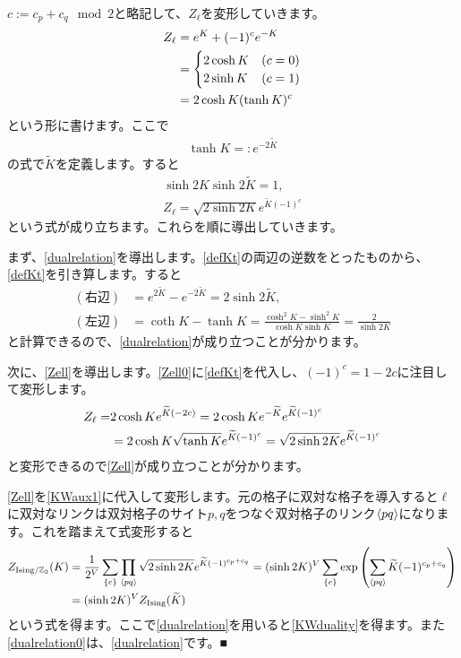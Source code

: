\documentclass[report,paper=a4, fontsize=12pt, line_length=16cm, number_of_lines=33,dvipdfmx]{jlreq}
\newcommand{\qed}{■}
\numberwithin{equation}{chapter}
\newcommand{\Zb}{\mathbb{Z}}
\newcommand{\ZIsing}{Z_{\mathrm{Ising}}}
\newcommand{\Zgauged}{Z_{\mathrm{Ising}/\Zb_2}}
\newcommand{\Kt}{\widetilde{K}}
\newcommand{\link}[1]{\expval{#1}}
\begin{document}
$c:=c_{p}+c_{q} \mod 2$と略記して、$Z_{\ell}$を変形していきます。
\begin{align}
  Z_{\ell}&=e^{K}+(-1)^{c}e^{-K}\notag\\
  &=\begin{cases}
    2\cosh K & (c=0)\\
    2\sinh K & (c=1)
  \end{cases}\notag \\
  &= 2 \cosh K (\tanh K)^{c} \label{Zell0}
\end{align}
という形に書けます。ここで
\begin{align}
  \tanh K =: e^{-2\Kt}\label{defKt}
\end{align}
の式で$\Kt$を定義します。すると
\begin{align}
  \sinh 2K \sinh 2\Kt =1,\label{dualrelation}\\
  Z_{\ell}=\sqrt{2\sinh 2K} e^{\Kt(-1)^{c}}\label{Zell}
\end{align}
という式が成り立ちます。これらを順に導出していきます。

まず、\eqref{dualrelation}を導出します。\eqref{defKt}の両辺の逆数をとったものから、\eqref{defKt}を引き算します。すると
\begin{align}
  (\text{右辺})&=e^{2\Kt}-e^{-2\Kt}=2\sinh 2\Kt,\\
  (\text{左辺})&=\coth K -\tanh K
  =\frac{\cosh^2 K -\sinh^2 K}{\cosh K \sinh K}
  =\frac{2}{\sinh 2K}
\end{align}
と計算できるので、\eqref{dualrelation}が成り立つことが分かります。

次に、\eqref{Zell}を導出します。\eqref{Zell0}に\eqref{defKt}を代入し、$(-1)^c=1-2c$に注目して変形します。
\begin{align}
  Z_{\ell}=&
  2\cosh K e^{\Kt(-2c)}=
  2\cosh K e^{-\Kt}e^{\Kt(-1)^c}\notag\\&=
  2\cosh K \sqrt{\tanh K}e^{\Kt(-1)^c}=
  \sqrt{2\sinh 2K}e^{\Kt(-1)^c}
\end{align}
と変形できるので\eqref{Zell}が成り立つことが分かります。

\eqref{Zell}を\eqref{KWaux1}に代入して変形します。元の格子に双対な格子を導入すると$\ell$に双対なリンクは双対格子のサイト$p,q$をつなぐ双対格子のリンク$\link{pq}$になります。これを踏まえて式変形すると
\begin{align}
 \Zgauged(K)&=\frac{1}{2^V}\sum_{\{c\}}\prod_{\link{pq}}\sqrt{2\sinh 2K}e^{\Kt(-1)^{c_p+c_q}}
 =(\sinh 2K)^{V}\sum_{\{c\}}\exp\left(\sum_{\link{pq}}\Kt(-1)^{c_p+c_q}\right)\notag\\
 &=(\sinh 2K)^{V} \ZIsing(\Kt)
\end{align}
という式を得ます。ここで\eqref{dualrelation}を用いると\eqref{KWduality}を得ます。また\eqref{dualrelation0}は、\eqref{dualrelation}です。\qed
\end{document}
